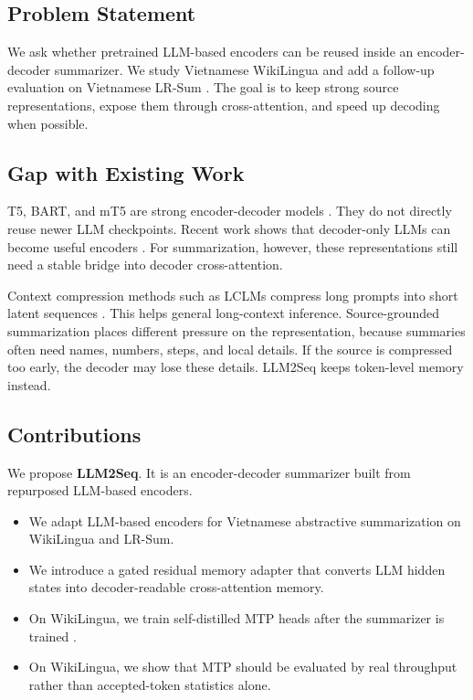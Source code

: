 \documentclass[11pt]{article}
\begin{document}
\subsection{Problem Statement}

We ask whether pretrained LLM-based encoders can be reused inside an encoder-decoder summarizer.
We study Vietnamese WikiLingua \citep{ladhak2020wikilingua} and add a follow-up evaluation on Vietnamese LR-Sum \citep{palen-michel-lignos-2023-lr}.
The goal is to keep strong source representations, expose them through cross-attention, and speed up decoding when possible.

\subsection{Gap with Existing Work}

T5, BART, and mT5 are strong encoder-decoder models \citep{raffel2020t5,lewis2020bart,xue2021mt5}.
They do not directly reuse newer LLM checkpoints.
Recent work shows that decoder-only LLMs can become useful encoders \citep{behnamghader2024llm2vec,luo2025lamate}.
For summarization, however, these representations still need a stable bridge into decoder cross-attention.

Context compression methods such as LCLMs compress long prompts into short latent sequences \citep{li2026contextcompression}.
This helps general long-context inference.
Source-grounded summarization places different pressure on the representation, because summaries often need names, numbers, steps, and local details.
If the source is compressed too early, the decoder may lose these details.
LLM2Seq keeps token-level memory instead.

\subsection{Contributions}

We propose \textbf{LLM2Seq}.
It is an encoder-decoder summarizer built from repurposed LLM-based encoders.
\begin{itemize}
    \item We adapt LLM-based encoders for Vietnamese abstractive summarization on WikiLingua and LR-Sum.
    \item We introduce a gated residual memory adapter that converts LLM hidden states into decoder-readable cross-attention memory.
    \item On WikiLingua, we train self-distilled MTP heads after the summarizer is trained \citep{gloeckle2024mtp,zhao2026mtpdistill}.
    \item On WikiLingua, we show that MTP should be evaluated by real throughput rather than accepted-token statistics alone.
\end{itemize}
\end{document}
